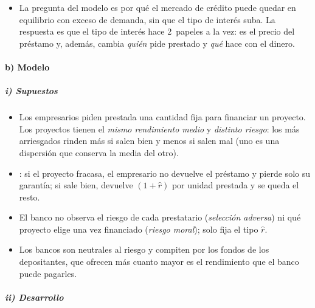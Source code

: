\documentclass[11pt]{article}
\begin{document}
\begin{itemize}
\item La pregunta del modelo es por qué el mercado de crédito puede quedar en equilibrio con exceso de demanda, sin que el tipo de interés suba. La respuesta es que el tipo de interés hace 2~papeles a la vez: es el precio del préstamo y, además, cambia \emph{quién} pide prestado y \emph{qué} hace con el dinero.
\end{itemize}

\paragraph{b) Modelo}

\subparagraph{i) Supuestos}

\begin{itemize}
\item Los empresarios piden prestada una cantidad fija para financiar un proyecto. Los proyectos tienen el \emph{mismo rendimiento medio} y \emph{distinto riesgo}: los más arriesgados rinden más si salen bien y menos si salen mal (uno es una dispersión que conserva la media del otro).
\item {}: si el proyecto fracasa, el empresario no devuelve el préstamo y pierde solo su garantía; si sale bien, devuelve $(1+\hat r)$ por unidad prestada y se queda el resto.
\item El banco no observa el riesgo de cada prestatario (\emph{selección adversa}) ni qué proyecto elige una vez financiado (\emph{riesgo moral}); solo fija el tipo $\hat r$.
\item Los bancos son neutrales al riesgo y compiten por los fondos de los depositantes, que ofrecen más cuanto mayor es el rendimiento que el banco puede pagarles.
\end{itemize}

\subparagraph{ii) Desarrollo}
\end{document}
